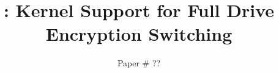 















\def \mytitle {\sys: Navigating Tradeoffs in Stream Cipher Based Full Drive Encryption}

\def \mytitle {\sys: ?????????????}

\def \mytitle {\sys: Kernel Support for Full Drive Encryption Switching}


\title{\textsf{\textbf{\mytitle}}}


\author{Paper \# ??}


\date{}


\maketitle


